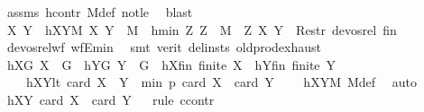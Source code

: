 \begin{isabellebody}
\ assms\ hcontr\ M{\isacharunderscore}{\kern0pt}def\ not{\isacharunderscore}{\kern0pt}le\ \isamarkupfalse%
\ blast\isanewline
\ \ \isamarkupfalse%
\ \isamarkupfalse%
\ X\ Y\ \ hXYM{\isacharcolon}{\kern0pt}\ {\isachardoublequoteopen}{\isacharparenleft}{\kern0pt}X{\isacharcomma}{\kern0pt}\ Y{\isacharparenright}{\kern0pt}\ {\isasymin}\ M{\isachardoublequoteclose}\ \ hmin{\isacharcolon}{\kern0pt}\ {\isachardoublequoteopen}{\isasymAnd}Z{\isachardot}{\kern0pt}\ Z\ {\isasymin}\ M\ {\isasymLongrightarrow}\ {\isacharparenleft}{\kern0pt}Z{\isacharcomma}{\kern0pt}\ {\isacharparenleft}{\kern0pt}X{\isacharcomma}{\kern0pt}\ Y{\isacharparenright}{\kern0pt}{\isacharparenright}{\kern0pt}\ {\isasymnotin}\ Restr\ devos{\isacharunderscore}{\kern0pt}rel\ {\isacharquery}{\kern0pt}fin{\isachardoublequoteclose}\ \isanewline
\ \ \ \ \isamarkupfalse%
\ devos{\isacharunderscore}{\kern0pt}rel{\isacharunderscore}{\kern0pt}wf\ wfE{\isacharunderscore}{\kern0pt}min\ \isamarkupfalse%
\ {\isacharparenleft}{\kern0pt}smt\ {\isacharparenleft}{\kern0pt}verit{\isacharcomma}{\kern0pt}\ del{\isacharunderscore}{\kern0pt}insts{\isacharparenright}{\kern0pt}\ old{\isachardot}{\kern0pt}prod{\isachardot}{\kern0pt}exhaust{\isacharparenright}{\kern0pt}\isanewline
\ \ \isamarkupfalse%
\ hXG{\isacharcolon}{\kern0pt}\ {\isachardoublequoteopen}X\ {\isasymsubseteq}\ G{\isachardoublequoteclose}\ \ hYG{\isacharcolon}{\kern0pt}\ {\isachardoublequoteopen}Y\ {\isasymsubseteq}\ G{\isachardoublequoteclose}\ \ hXfin{\isacharcolon}{\kern0pt}\ {\isachardoublequoteopen}finite\ X{\isachardoublequoteclose}\ \ hYfin{\isacharcolon}{\kern0pt}\ {\isachardoublequoteopen}finite\ Y{\isachardoublequoteclose}\ \ \isanewline
\ \ \ \ hXYlt{\isacharcolon}{\kern0pt}\ {\isachardoublequoteopen}card\ {\isacharparenleft}{\kern0pt}X\ {\isasymcdots}\ Y{\isacharparenright}{\kern0pt}\ {\isacharless}{\kern0pt}\ min\ p\ {\isacharparenleft}{\kern0pt}card\ X\ {\isacharplus}{\kern0pt}\ card\ Y\ {\isacharminus}{\kern0pt}\ {}{\isacharparenright}{\kern0pt}{\isachardoublequoteclose}\ \isamarkupfalse%
\ hXYM\ M{\isacharunderscore}{\kern0pt}def\ \isamarkupfalse%
\ auto\isanewline
\ \ \isamarkupfalse%
\ hXY{\isacharcolon}{\kern0pt}\ {\isachardoublequoteopen}card\ X\ {\isasymle}\ card\ Y{\isachardoublequoteclose}\isanewline
\ \ \isamarkupfalse%
{\isacharparenleft}{\kern0pt}rule\ ccontr{\isacharparenright}{\kern0pt}\isanewline

\end{isabellebody}
